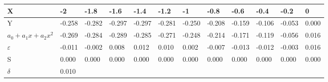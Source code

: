 \begin{longtable}{|l|lllllllllll|}
\hline
X &
  \multicolumn{1}{l|}{-2} &
  \multicolumn{1}{l|}{-1.8} &
  \multicolumn{1}{l|}{-1.6} &
  \multicolumn{1}{l|}{-1.4} &
  \multicolumn{1}{l|}{-1.2} &
  \multicolumn{1}{l|}{-1} &
  \multicolumn{1}{l|}{-0.8} &
  \multicolumn{1}{l|}{-0.6} &
  \multicolumn{1}{l|}{-0.4} &
  \multicolumn{1}{l|}{-0.2} &
  0 \\ \hline
\endfirsthead
%
\endhead
%
Y &
  \multicolumn{1}{l|}{-0.258} &
  \multicolumn{1}{l|}{-0.282} &
  \multicolumn{1}{l|}{-0.297} &
  \multicolumn{1}{l|}{-0.297} &
  \multicolumn{1}{l|}{-0.281} &
  \multicolumn{1}{l|}{-0.250} &
  \multicolumn{1}{l|}{-0.208} &
  \multicolumn{1}{l|}{-0.159} &
  \multicolumn{1}{l|}{-0.106} &
  \multicolumn{1}{l|}{-0.053} &
  0.000 \\ \hline
$a_0+a_1x+a_2x^2$ &
  \multicolumn{1}{l|}{-0.269} &
  \multicolumn{1}{l|}{-0.284} &
  \multicolumn{1}{l|}{-0.289} &
  \multicolumn{1}{l|}{-0.285} &
  \multicolumn{1}{l|}{-0.271} &
  \multicolumn{1}{l|}{-0.248} &
  \multicolumn{1}{l|}{-0.214} &
  \multicolumn{1}{l|}{-0.171} &
  \multicolumn{1}{l|}{-0.119} &
  \multicolumn{1}{l|}{-0.056} &
  0.016 \\ \hline
$\varepsilon$ &
  \multicolumn{1}{l|}{-0.011} &
  \multicolumn{1}{l|}{-0.002} &
  \multicolumn{1}{l|}{0.008} &
  \multicolumn{1}{l|}{0.012} &
  \multicolumn{1}{l|}{0.010} &
  \multicolumn{1}{l|}{0.002} &
  \multicolumn{1}{l|}{-0.007} &
  \multicolumn{1}{l|}{-0.013} &
  \multicolumn{1}{l|}{-0.012} &
  \multicolumn{1}{l|}{-0.003} &
  0.016 \\ \hline
S &
  \multicolumn{1}{l|}{0.000} &
  \multicolumn{1}{l|}{0.000} &
  \multicolumn{1}{l|}{0.000} &
  \multicolumn{1}{l|}{0.000} &
  \multicolumn{1}{l|}{0.000} &
  \multicolumn{1}{l|}{0.000} &
  \multicolumn{1}{l|}{0.000} &
  \multicolumn{1}{l|}{0.000} &
  \multicolumn{1}{l|}{0.000} &
  \multicolumn{1}{l|}{0.000} &
  0.000 \\ \hline
$\delta$ & \multicolumn{11}{l|}{0.010}    \\ \hline
\end{longtable}